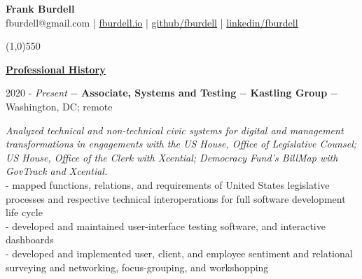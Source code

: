 \documentclass[8pt]{article}
\begin{document}
\begin{center}
\thispagestyle{empty}
	 \textbf{Frank Burdell} \\[0pt]
	fburdell@gmail.com | \href{https://fburdell.github.io}{fburdell.io} | \href{https://github.com/fburdell/}{github/fburdell} | \href{https://www.linkedin.com/in/fburdell/}{linkedin/fburdell}

\line(1,0){550}\\[10pt]
\end{center}

\begin{center}
	\textbf{\underline{\Large{Professional History}}}
\end{center}

2020 - \textit{Present} $-$ \textbf{Associate, Systems and Testing} $-$ \textbf{Kastling Group} $-$ Washington, DC; remote

\begin{adjustwidth}{1cm}{1cm}
	\textit{Analyzed technical and non-technical civic systems for digital and management transformations in engagements with the US House, Office of Legislative Counsel; US House, Office of the Clerk with Xcential; Democracy Fund's BillMap with GovTrack and Xcential.} \\
	- mapped functions, relations, and requirements of United States legislative processes and respective technical interoperations for full software development life cycle \\
	- developed and maintained user-interface testing software, and interactive dashboards \\
	- developed and implemented user, client, and employee sentiment and relational surveying and networking, focus-grouping, and workshopping \\


\end{adjustwidth}
\end{document}
